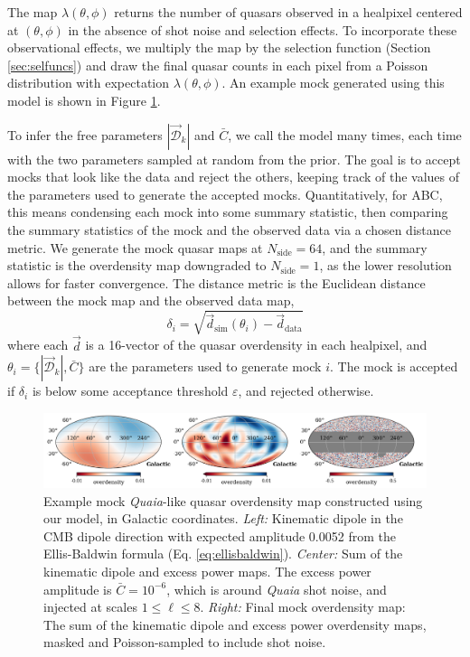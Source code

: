 \documentclass[modern]{aastex631}
\newcommand{\quaia}{\textsl{Quaia}\xspace}
\newcommand{\nside}{N_\mathrm{side}}
\newcommand{\dipamp}{|\vec{\mathcal{D}}_k|}
\begin{document}
The map $\lambda(\theta,\phi)$ returns the number of quasars observed in a healpixel centered at $(\theta,\phi)$ in the absence of shot noise and selection effects.
To incorporate these observational effects, we multiply the map by the selection function (Section \ref{sec:selfuncs}) and draw the final quasar counts in each pixel from a Poisson distribution with expectation $\lambda(\theta,\phi)$.
An example mock generated using this model is shown in Figure \ref{fig:example_mock}.

To infer the free parameters $\dipamp$ and $\bar C$, we call the model many times, each time with the two parameters sampled at random from the prior.
The goal is to accept mocks that look like the data and reject the others, keeping track of the values of the parameters used to generate the accepted mocks.
Quantitatively, for ABC, this means condensing each mock into some summary statistic, then comparing the summary statistics of the mock and the observed data via a chosen distance metric.
We generate the mock quasar maps at $\nside=64$, and the summary statistic is the overdensity map downgraded to $\nside=1$, as the lower resolution allows for faster convergence.
The distance metric is the Euclidean distance between the mock map and the observed data map,
\begin{equation}
    \delta_i = \sqrt{\vec d_\mathrm{sim}(\theta_i)-\vec d_\mathrm{data}}
\end{equation}
where each $\vec d$ is a 16-vector of the quasar overdensity in each healpixel, and $\theta_i=\{\dipamp,\bar C\}$ are the parameters used to generate mock $i$.
The mock is accepted if $\delta_i$ is below some acceptance threshold $\varepsilon$, and rejected otherwise.

\begin{figure}
    \centering
    \includegraphics[width=\textwidth]{images/example_mock.png}
    \caption{Example mock \quaia-like quasar overdensity map constructed using our model, in Galactic coordinates. \textit{Left:} Kinematic dipole in the CMB dipole direction with expected amplitude 0.0052 from the Ellis-Baldwin formula (Eq. \ref{eq:ellisbaldwin}). \textit{Center:} Sum of the kinematic dipole and excess power maps. The excess power amplitude is $\bar C = 10^{-6}$, which is around \quaia shot noise, and injected at scales $1\le\ell\le 8$. \textit{Right:} Final mock overdensity map: The sum of the kinematic dipole and excess power overdensity maps, masked and Poisson-sampled to include shot noise.}
    \label{fig:example_mock}
\end{figure}
\end{document}
